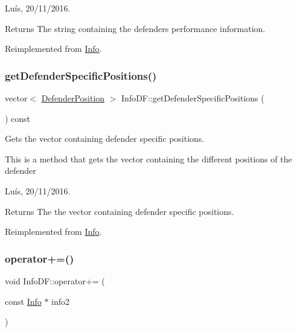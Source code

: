 Luís, 20/11/2016. 

\begin{DoxyReturn}{Returns}
The string containing the defender\textquotesingle{}s performance information. 
\end{DoxyReturn}


Reimplemented from \hyperlink{class_info_a5e52b35a9c17b58222bb57af16c16ce3}{Info}.

\hypertarget{class_info_d_f_a8e30128320b378b09477070781f9fe98}{}\label{class_info_d_f_a8e30128320b378b09477070781f9fe98} 
\subsubsection{\texorpdfstring{get\+Defender\+Specific\+Positions()}{getDefenderSpecificPositions()}}
{\footnotesize\ttfamily vector$<$ \hyperlink{_utils_8hpp_a94ee089ecd5db12c81c7edbefaabff4d}{Defender\+Position} $>$ Info\+D\+F\+::get\+Defender\+Specific\+Positions (\begin{DoxyParamCaption}{ }\end{DoxyParamCaption}) const\hspace{0.3cm}{\ttfamily [virtual]}}



Gets the vector containing defender specific positions. 

This is a method that gets the vector containing the different positions of the defender

Luís, 20/11/2016. 

\begin{DoxyReturn}{Returns}
The the vector containing defender specific positions. 
\end{DoxyReturn}


Reimplemented from \hyperlink{class_info_afa64d6a602f80674209e3391bf5fa309}{Info}.

\hypertarget{class_info_d_f_a7dc54a1e9dbb5028eb1f9972d1e42951}{}\label{class_info_d_f_a7dc54a1e9dbb5028eb1f9972d1e42951} 
\subsubsection{\texorpdfstring{operator+=()}{operator+=()}}
{\footnotesize\ttfamily void Info\+D\+F\+::operator+= (\begin{DoxyParamCaption}\item[{const \hyperlink{class_info}{Info} $\ast$}]{info2 }\end{DoxyParamCaption})\hspace{0.3cm}{\ttfamily [virtual]}}



